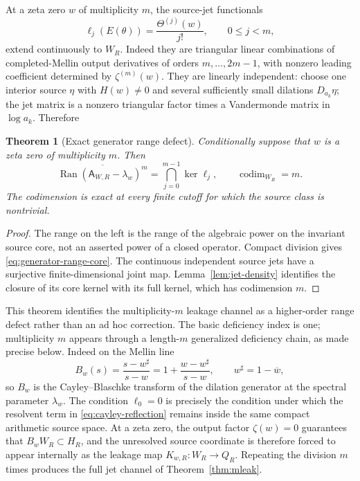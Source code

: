 \documentclass[11pt]{article}
\newtheorem{theorem}{Theorem}[section]
\theoremstyle{remark}
\begin{document}
At a zeta zero $w$ of multiplicity $m$, the source-jet functionals
\[
 \ell_j(E(\theta))=\frac{\Theta^{(j)}(w)}{j!},\qquad 0\le j<m,
\]
extend continuously to $W_R$.  Indeed they are triangular linear combinations of completed-Mellin output derivatives of orders $m,\ldots,2m-1$, with nonzero leading coefficient determined by $\zeta^{(m)}(w)$.  They are linearly independent: choose one interior source $\eta$ with $H(w)\ne0$ and several sufficiently small dilations $D_{a_k}\eta$; the jet matrix is a nonzero triangular factor times a Vandermonde matrix in $\log a_k$.  Therefore
\begin{theorem}[Exact generator range defect]\label{thm:generator-defect}
Conditionally suppose that $w$ is a zeta zero of multiplicity $m$.  Then
\begin{equation}\label{eq:generator-codim}
 \boxed{
 \overline{\operatorname{Ran}(\mathsf A_{W,R}-\lambda_w)^m}
 =\bigcap_{j=0}^{m-1}\ker\ell_j,
 \qquad
 \operatorname{codim}_{W_R}=m.
 }
\end{equation}
The codimension is exact at every finite cutoff for which the source class is nontrivial.
\end{theorem}
\begin{proof}
The range on the left is the range of the algebraic power on the invariant
source core, not an asserted power of a closed operator. Compact division
gives \eqref{eq:generator-range-core}. The continuous independent source
jets have a surjective finite-dimensional joint map. Lemma~\ref{lem:jet-density}
identifies the closure of its core kernel with its full kernel, which has
codimension $m$.
\end{proof}

This theorem identifies the multiplicity-$m$ leakage channel as a higher-order range defect rather than an ad hoc correction.  The basic deficiency index is one; multiplicity $m$ appears through a length-$m$ generalized deficiency chain, as made precise below.  Indeed on the Mellin line
\begin{equation}\label{eq:cayley-reflection}
 B_w(s)=\frac{s-w^\sharp}{s-w}
 =1+\frac{w-w^\sharp}{s-w},
 \qquad w^\sharp=1-\overline w,
\end{equation}
so $B_w$ is the Cayley--Blaschke transform of the dilation generator at the spectral parameter $\lambda_w$.  The condition $\ell_0=0$ is precisely the condition under which the resolvent term in \eqref{eq:cayley-reflection} remains inside the same compact arithmetic source space.  At a zeta zero, the output factor $\zeta(w)=0$ guarantees that $B_wW_R\subset H_R$, and the unresolved source coordinate is therefore forced to appear internally as the leakage map $K_{w,R}:W_R\to Q_R$.  Repeating the division $m$ times produces the full jet channel of Theorem~\ref{thm:mleak}.
\end{document}
